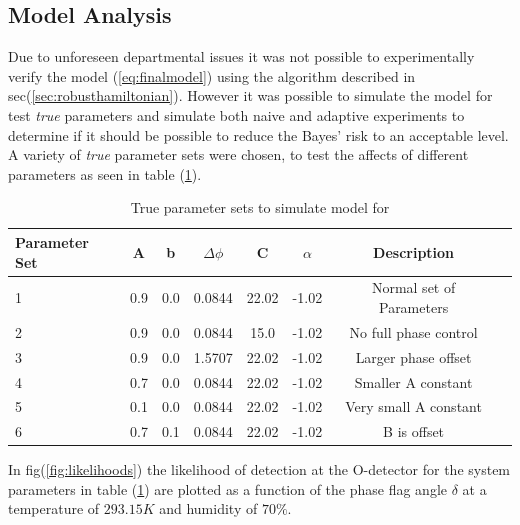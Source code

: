 \subsection{Model Analysis}
Due to unforeseen departmental issues it was not possible to experimentally verify the model (\ref{eq:finalmodel}) using the algorithm described in sec(\ref{sec:robusthamiltonian}). However it was possible to simulate the model for test \textit{true} parameters and simulate both naive and adaptive experiments to determine if it should be possible to reduce the Bayes' risk to an acceptable level. A variety of \textit{true} parameter sets were chosen, to test the affects of different parameters as seen in table (\ref{tab:trueparams}). 
\begin{table}[h]
\begin{center}
\begin{tabular}{l*{6}{c}r}
Parameter Set     & A&b& $\Delta\phi$ & C & $\alpha$ & Description \\
\hline
1& 0.9& 0.0& 0.0844& 22.02& -1.02 & Normal set of Parameters  \\
2&  0.9& 0.0& 0.0844& 15.0& -1.02 & No full phase control \\
3& 0.9& 0.0& 1.5707& 22.02& -1.02 &   Larger phase offset \\
4& 0.7& 0.0& 0.0844& 22.02& -1.02 & Smaller A constant\\
5& 0.1& 0.0& 0.0844& 22.02& -1.02 & Very small A constant\\
6&  0.7& 0.1& 0.0844& 22.02& -1.02 & B is offset\\
\end{tabular}
\caption{True parameter sets to simulate model for}
\label{tab:trueparams}
\end{center}
\end{table}
In fig(\ref{fig:likelihoods}) the likelihood of detection at the O-detector for the system parameters in table (\ref{tab:trueparams}) are plotted as a function of the phase flag angle $\delta$ at a temperature of $293.15K$ and humidity of $70\%$. 


